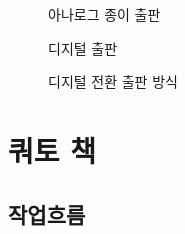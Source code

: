 \documentclass[
  letterpaper,
]{book}
\begin{document}
\begin{figure}

\begin{minipage}[t]{\linewidth}

{\centering 


\caption{아나로그 종이 출판}

}

\end{minipage}%
\newline
\begin{minipage}[t]{\linewidth}

{\centering 


\caption{디지털 출판}

}

\end{minipage}%

\caption{\label{fig-pdf}디지털 전환 출판 방식}

\end{figure}

\hypertarget{uxcffcuxd1a0-uxcc45}{%
\chapter{쿼토 책}\label{uxcffcuxd1a0-uxcc45}}

\hypertarget{uxc791uxc5c5uxd750uxb984-1}{%
\section{작업흐름}\label{uxc791uxc5c5uxd750uxb984-1}}
\end{document}

